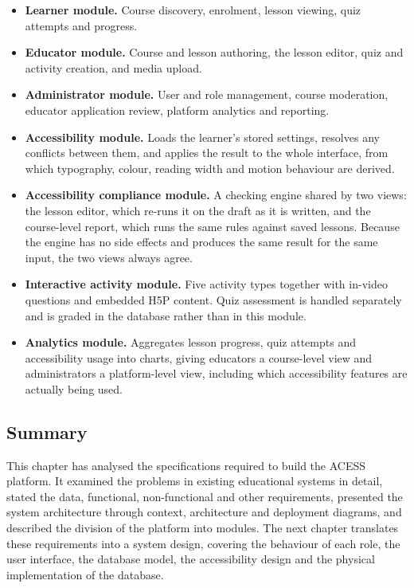 \documentclass[12pt, oneside]{article} %
\begin{document}
\begin{itemize}
    \item \textbf{Learner module.} Course discovery, enrolment, lesson viewing, quiz attempts and progress.
    \item \textbf{Educator module.} Course and lesson authoring, the lesson editor, quiz and activity creation, and media upload.
    \item \textbf{Administrator module.} User and role management, course moderation, educator application review, platform analytics and reporting.
    \item \textbf{Accessibility module.} Loads the learner's stored settings, resolves any conflicts between them, and applies the result to the whole interface, from which typography, colour, reading width and motion behaviour are derived.
    \item \textbf{Accessibility compliance module.} A checking engine shared by two views: the lesson editor, which re-runs it on the draft as it is written, and the course-level report, which runs the same rules against saved lessons. Because the engine has no side effects and produces the same result for the same input, the two views always agree.
    \item \textbf{Interactive activity module.} Five activity types together with in-video questions and embedded H5P content. Quiz assessment is handled separately and is graded in the database rather than in this module.
    \item \textbf{Analytics module.} Aggregates lesson progress, quiz attempts and accessibility usage into charts, giving educators a course-level view and administrators a platform-level view, including which accessibility features are actually being used.
\end{itemize}

\subsection{Summary}

This chapter has analysed the specifications required to build the ACESS platform. It examined the problems in existing educational systems in detail, stated the data, functional, non-functional and other requirements, presented the system architecture through context, architecture and deployment diagrams, and described the division of the platform into modules. The next chapter translates these requirements into a system design, covering the behaviour of each role, the user interface, the database model, the accessibility design and the physical implementation of the database.
\end{document}
